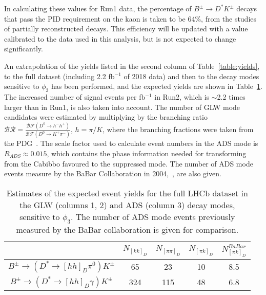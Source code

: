\documentclass[oneside,12pt]{article}
\begin{document}
In calculating these values for Run1 data, the percentage of
$B^{\pm}\rightarrow D^*K^{\pm}$ decays that pass the PID requirement on the
kaon is taken to be 64\%, from the studies of partially reconstructed decays.
This efficiency will be updated with a value calibrated to the data used in
this analysis, but is not expected to change significantly.

An extrapolation of the yields listed in the second column of
Table~\ref{table:yields}, to the full dataset (including 2.2 fb$^{-1}$ of 2018
data) and then to the decay modes sensitive to $\phi_3$ has been performed, and
the expected yields are shown in Table~\ref{table:extrapolatedYields}. The
increased number of signal events per fb$^{-1}$ in Run2, which is $\sim$2.2
times larger than in Run1, is also taken into account. The number of GLW mode
candidates were estimated by multiplying by the branching ratio $\mathcal{BR} =
\frac{\mathcal{BF}(D^0 \rightarrow h^- h^+)}{\mathcal{BF}(D^0 \rightarrow K^+
\pi^-)}$, $h=\pi/K$, where the branching fractions were taken from the
PDG~\cite{PDG2018}. The scale factor used to calculate event numbers in the ADS
mode is $R_{ADS}\approx 0.015$, which contains the phase information needed for
transforming from the Cabibbo favoured to the suppressed mode.  The number of
ADS mode events measure by the BaBar Collaboration in 2004,~\cite{BaBarADS}, are
also given.

\begin{table}[H]
  \centering
  \begin{tabular}{| c | c | c | c | c |}
    \hline
    & $N_{[kk]_{D}}$ & $N_{[\pi\pi]_{D}}$ & $N_{[\pi k]_D}$ & $N_{[\pi k]_D}^{BaBar}$ \\ \hline
    $B^{\pm}\rightarrow(D^*\rightarrow [hh]_D\pi^0)K^{\pm}$ & 65 & 23  & 10 & 8.5 \\ \hline
    $B^{\pm}\rightarrow(D^*\rightarrow [hh]_D\gamma)K^{\pm}$ & 324 & 115 & 48 & 6.8 \\ \hline
  \end{tabular}
  \caption{{Estimates of the expected event yields for the full LHCb
  dataset in the GLW (columns 1, 2) and ADS (column 3) decay modes, sensitive to
  $\phi_3$. The number of ADS mode events previously measured by the BaBar
  collaboration is given for comparison.}} \label{table:extrapolatedYields}
\end{table}

\end{document}
